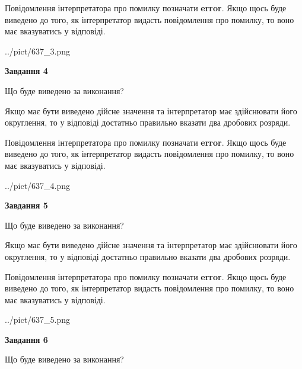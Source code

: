 \documentclass[12pt, ukrainian]{article}
\begin{document}
{\begin {Large}
Повідомлення інтерпретатора про помилку позначати \textbf{error}.
Якщо щось буде виведено до того, як інтерпретатор видасть повідомлення про помилку, 
то воно має вказуватись у відповіді. \par

\begin{center}
	{../pict/637_3.png}
\end{center}
\newpage

{\begin {center}\textbf{Завдання 4}\end {center}}\par
Що буде виведено за виконання? \par

Якщо має бути виведено дійсне значення та інтерпретатор має здійснювати його округлення, 
то у відповіді достатньо правильно вказати два дробових розряди.

Повідомлення інтерпретатора про помилку позначати \textbf{error}.
Якщо щось буде виведено до того, як інтерпретатор видасть повідомлення про помилку, 
то воно має вказуватись у відповіді. \par

\begin{center}
	{../pict/637_4.png}
\end{center}
\newpage

{\begin {center}\textbf{Завдання 5}\end {center}}\par
Що буде виведено за виконання? \par

Якщо має бути виведено дійсне значення та інтерпретатор має здійснювати його округлення, 
то у відповіді достатньо правильно вказати два дробових розряди.

Повідомлення інтерпретатора про помилку позначати \textbf{error}.
Якщо щось буде виведено до того, як інтерпретатор видасть повідомлення про помилку, 
то воно має вказуватись у відповіді. \par

\begin{center}
	{../pict/637_5.png}
\end{center}
\newpage

{\begin {center}\textbf{Завдання 6}\end {center}}\par
Що буде виведено за виконання? \par


\end{Large}}
\end{document}
